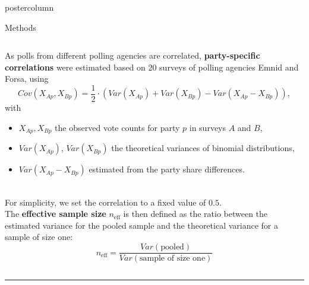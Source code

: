 \documentclass[final,hyperref={pdfpagelabels=false}]{beamer}
\let\olditem\item
\renewcommand\item{\justifying\olditem} %
\newcommand{\darkgray}[1]{\textcolor{koaladarkgray}{#1}}
\begin{document}
\begin{frame}
\begin{columns}
\begin{column}{1\textwidth}
\begin{columns}[T]
\begin{column}{.484\textwidth}
\begin{beamercolorbox}[center,wd=\textwidth]{postercolumn}
\begin{minipage}[T]{.95\textwidth}
\begin{block}{\footnotesize Methods}
\begin{minipage}{\textwidth}
\begin{columns}[t]
  \begin{column}{.93\textwidth}
  \vspace{7px}
  \begin{minipage}{\textwidth}
As polls from different polling agencies are correlated, \darkgray{\textbf{party-specific correlations}} were
estimated based on 20 surveys of polling agencies Emnid and Forsa, using
$$
Cov(X_{Ap}, X_{Bp}) = \frac{1}{2} \cdot \left(Var(X_{Ap}) + Var(X_{Bp}) - Var(X_{Ap} - X_{Bp}) \right),
$$
\darkgray{\footnotesize with \\}
\begin{minipage}{\textwidth}
\hspace{0.5in}
\begin{itemize}
  \item \darkgray{\footnotesize $X_{Ap},X_{Bp}$ the observed vote counts for party $p$ in surveys $A$ and $B$,}
  \item \darkgray{\footnotesize $Var(X_{Ap})$, $Var(X_{Bp})$ the theoretical variances of binomial distributions,}
  \item \darkgray{\footnotesize $Var(X_{Ap} - X_{Bp})$ estimated from the party share differences.}
\end{itemize}
\end{minipage}
\\[0.8cm]
For simplicity, we set the correlation to a fixed value of $0.5$.
\\[0.5cm]
The \darkgray{\textbf{effective sample size}} $n_{\text{eff}}$ is then defined as the ratio between
the estimated variance for the pooled sample and the theoretical variance for a
sample of size one: \\[0.1cm]
$$
n_{\text{eff}} = \frac{Var(\text{pooled})}{Var(\text{sample of size one})}
$$
  \end{minipage}
  \vspace{7px}
  \end{column}
\end{columns}
\end{minipage}
\vspace{1ex}
\textcolor{LMUlightgray}{\hrule{}}


\end{block}
\end{minipage}
\end{beamercolorbox}
\end{column}
\end{columns}
\end{column}
\end{columns}
\end{frame}
\end{document}
